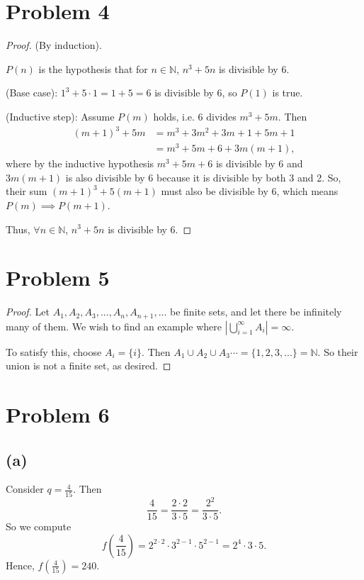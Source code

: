\documentclass{article}
\begin{document}
\section*{Problem 4}
\begin{proof}
	(By induction). 
	
	$P(n)$ is the hypothesis that for $n\in\mathbb{N}$, $n^3 + 5n$ is divisible by $6$.
	
	(Base case): $1^3 + 5\cdot1 = 1 + 5 = 6$ is divisible by 6, so $P(1)$ is true. 
	
	(Inductive step): Assume $P(m)$ holds, i.e. 6 divides $m^3 + 5m$. Then
	\begin{align}
		(m+1)^3 + 5m &= m^3 + 3m^2 + 3m + 1 + 5m + 1 \\
		&= m^3 + 5m + 6 + 3m(m+1), 
	\end{align}
	where by the inductive hypothesis $m^3 +5m + 6$ is divisible by 6 and $3m(m+1)$ is also divisible by 6 because it is divisible by both 3 and 2. So, their sum $(m+1)^3 + 5(m+1)$ must also be divisible by 6, which means $P(m)\implies P(m+1)$.
	
	Thus, $\forall n\in\mathbb{N}$, $n^3 + 5n$ is divisible by 6. 
\end{proof}

\section*{Problem 5}
\begin{proof}
	Let $A_1, A_2, A_3, ..., A_n, A_{n+1}, ...$ be finite sets, and let there be infinitely many of them. We wish to find an example where $|\bigcup\limits_{i=1}^{\infty} A_i| = \infty$. 
	
	To satisfy this, choose $A_{i} = \{i\}$. Then $A_1 \cup A_2 \cup A_3 \cdots = \{1, 2, 3, ... \} = \mathbb{N}$. So their union is not a finite set, as desired. 
\end{proof}

\section*{Problem 6}
\subsection*{(a)}
Consider $q=\frac{4}{15}$. Then 
\begin{equation}
	\frac{4}{15} = \frac{2\cdot2}{3\cdot5} = \frac{2^2}{3\cdot5}.
\end{equation}
So we compute
\begin{equation}
	f\left(\frac{4}{15}\right) = 2^{2\cdot2} \cdot 3^{2-1}\cdot5^{2-1} = 2^4\cdot3\cdot5.
\end{equation}
Hence, $f\left(\frac{4}{15}\right)=240$.
\end{document}

